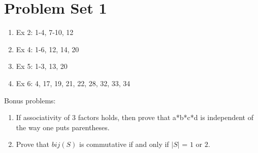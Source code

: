 \pagebreak
\section*{Problem Set 1}
\hypertarget{ModernAlgebra-Assignment01}{}

\begin{enumerate}
    \item{Ex 2: 1-4, 7-10, 12}
    \item{Ex 4: 1-6, 12, 14, 20}
    \item{Ex 5: 1-3, 13, 20}
    \item{Ex 6: 4, 17, 19, 21, 22, 28, 32, 33, 34}
\end{enumerate}

Bonus problems:
\begin{enumerate}
    \item{If associativity of 3 factors holds, then prove that a*b*c*d is independent of the way one puts parentheses.}
    \item{Prove that $ bij(S) $ is commutative if and only if $ |S| $ = $ 1 $ or $ 2 $.}
\end{enumerate}


